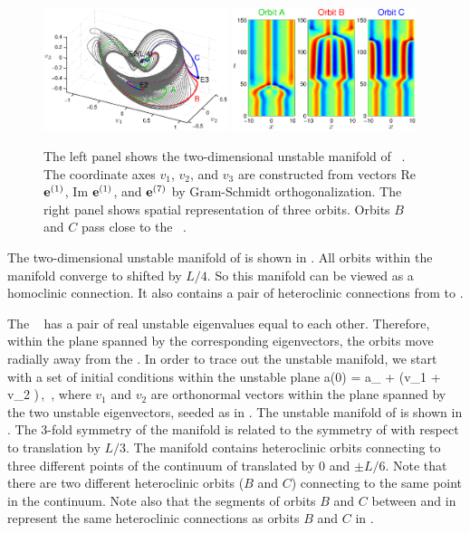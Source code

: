 \begin{figure}[h]
\begin{center}
\includegraphics[width=0.48\textwidth]{figs/ks22_E2_manifold.eps}%
\includegraphics[width=0.48\textwidth]{figs/ks22_E2_orbits.eps}
\end{center}
\caption{
The left panel shows the two-dimensional
unstable manifold of \eqv\ . The coordinate axes
$v_1$, $v_2$, and $v_3$ are constructed from vectors
Re ${\mathbf e}^{(1)}$, Im ${\mathbf e}^{(1)}$, and ${\mathbf e}^{(7)}$ by Gram-Schmidt orthogonalization.
The right panel shows spatial representation of three orbits. Orbits
$B$ and $C$ pass close to the \eqv\ .}
\label{f:KS22E2man}
\end{figure}

The two-dimensional unstable manifold of  is shown in
.  All orbits within the manifold converge
to  shifted by $L/4$.  So this manifold can be viewed as a homoclinic
connection.  It also contains a pair of heteroclinic connections from
 to .

The \eqv\  has a pair of real unstable eigenvalues
equal to each other.  Therefore, within the plane spanned by the
corresponding eigenvectors, the orbits move radially away from
the \eqv.  In order to trace out the unstable manifold,
we start with a set of initial conditions within the unstable plane
\beq
 a(0) = a_{{}} + \epsilon(v_1 \cos \phi + v_2 \sin \phi)\,,
  \quad\phi\in[0,2\pi]\,, 
\label{unsManSeed}
\eeq
where $v_1$ and $v_2$ are orthonormal vectors within the
plane spanned by the two unstable eigenvectors, seeded as in
.
  The unstable manifold
of  is shown in .  The 3-fold symmetry of
the manifold is related to the symmetry of  with respect to
translation by $L/3$.  The manifold contains heteroclinic orbits
connecting  to three different points of the continuum of {\eqva}
translated by 0 and $\pm L/6$.  Note that there are two different
heteroclinic orbits ($B$ and $C$) connecting  to the same point in the
 continuum.  Note also that the segments of orbits $B$ and $C$
between  and  in 
represent the same heteroclinic connections as orbits $B$ and $C$ in
.

